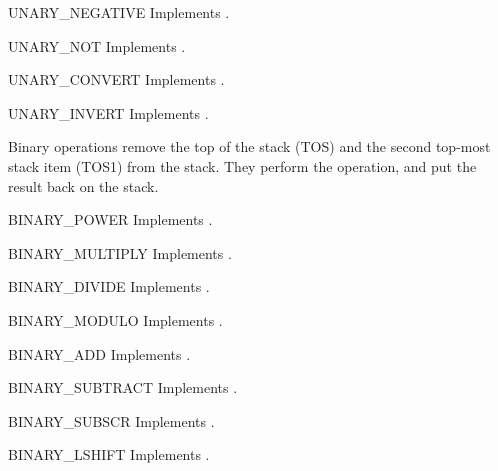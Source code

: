 \begin{opcodedesc}{UNARY_NEGATIVE}{}
Implements .
\end{opcodedesc}

\begin{opcodedesc}{UNARY_NOT}{}
Implements .
\end{opcodedesc}

\begin{opcodedesc}{UNARY_CONVERT}{}
Implements .
\end{opcodedesc}

\begin{opcodedesc}{UNARY_INVERT}{}
Implements .
\end{opcodedesc}

Binary operations remove the top of the stack (TOS) and the second top-most
stack item (TOS1) from the stack.  They perform the operation, and put the
result back on the stack.

\begin{opcodedesc}{BINARY_POWER}{}
Implements .
\end{opcodedesc}

\begin{opcodedesc}{BINARY_MULTIPLY}{}
Implements .
\end{opcodedesc}

\begin{opcodedesc}{BINARY_DIVIDE}{}
Implements .
\end{opcodedesc}

\begin{opcodedesc}{BINARY_MODULO}{}
Implements .
\end{opcodedesc}

\begin{opcodedesc}{BINARY_ADD}{}
Implements .
\end{opcodedesc}

\begin{opcodedesc}{BINARY_SUBTRACT}{}
Implements .
\end{opcodedesc}

\begin{opcodedesc}{BINARY_SUBSCR}{}
Implements .
\end{opcodedesc}

\begin{opcodedesc}{BINARY_LSHIFT}{}
Implements .
\end{opcodedesc}

